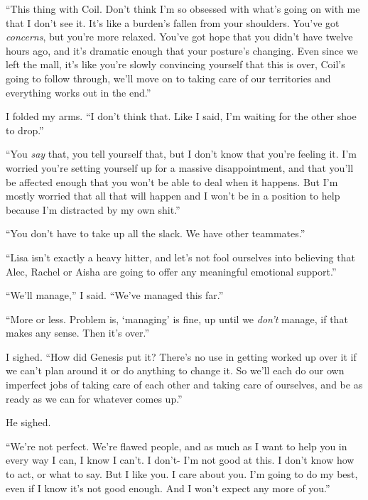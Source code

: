 ``This thing with Coil.  Don't think I'm so obsessed with what's going on with me that I don't see it.  It's like a burden's fallen from your shoulders.  You've got \emph{concerns}, but you're more relaxed.  You've got hope that you didn't have twelve hours ago, and it's dramatic enough that your posture's changing.  Even since we left the mall, it's like you're slowly convincing yourself that this is over, Coil's going to follow through, we'll move on to taking care of our territories and everything works out in the end.''



I folded my arms.  ``I don't think that.  Like I said, I'm waiting for the other shoe to drop.''



``You \emph{say} that, you tell yourself that, but I don't know that you're feeling it.  I'm worried you're setting yourself up for a massive disappointment, and that you'll be affected enough that you won't be able to deal when it happens.  But I'm mostly worried that all that will happen and I won't be in a position to help because I'm distracted by my own shit.''



``You don't have to take up all the slack.  We have other teammates.''



``Lisa isn't exactly a heavy hitter, and let's not fool ourselves into believing that Alec, Rachel or Aisha are going to offer any meaningful emotional support.''



``We'll manage,'' I said.  ``We've managed this far.''



``More or less.  Problem is, `managing' is fine, up until we \emph{don't} manage, if that makes any sense.  Then it's over.''



I sighed.  ``How did Genesis put it?  There's no use in getting worked up over it if we can't plan around it or do anything to change it.  So we'll each do our own imperfect jobs of taking care of each other and taking care of ourselves, and be as ready as we can for whatever comes up.''



He sighed.



``We're not perfect.  We're flawed people, and as much as I want to help you in every way I can, I know I can't.  I don't- I'm not good at this.  I don't know how to act, or what to say.  But I like you.  I care about you.  I'm going to do my best, even if I know it's not good enough.  And I won't expect any more of you.''



